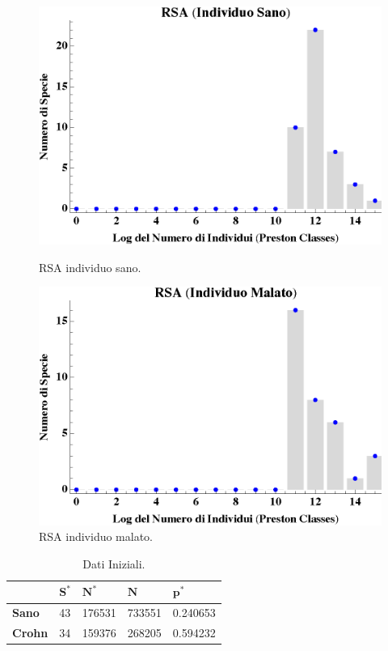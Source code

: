 \begin{figure}[H]
  \centering
  \begin{minipage}[b]{0.4\textwidth}
    \includegraphics[width=\textwidth]{Figure/RSAH.eps}
    \caption{RSA individuo sano.}
    \label{fig:RSAH}
  \end{minipage}
  \hfill
  \begin{minipage}[b]{0.4\textwidth}
    \includegraphics[width=\textwidth]{Figure/RSAC.eps}
    \caption{RSA individuo malato.}
    \label{fig:RSAC}
  \end{minipage}
\end{figure}

\begin{table}[H]
\centering
\begin{tabular}{l|l|l|l|l|}
\cline{2-5}
                                     & $\mathbf{S^*}$ & $\mathbf{N^*}$ & $\mathbf{N}$ & $\mathbf{p^*}$ \\ \hline
\multicolumn{1}{|l|}{\textbf{Sano}}  & 43                & 176531               & 733551           & 0.240653    \\ \hline
\multicolumn{1}{|l|}{\textbf{Crohn}} & 34                & 159376               & 268205           & 0.594232    \\ \hline
\end{tabular}
\caption{Dati Iniziali.}
\label{Tab:dati}
\end{table}

